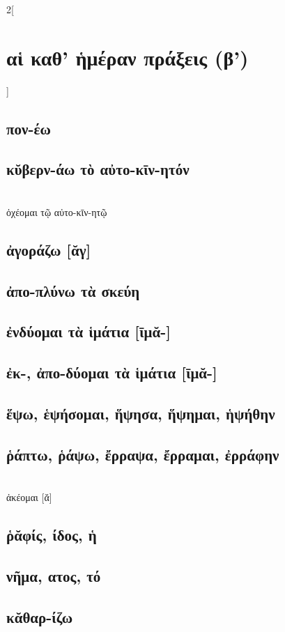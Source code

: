 \documentclass{book}
\begin{document}
\newpage
\begin{multicols}{2}[\section{αἱ καθ' ἡμέραν πράξεις (β')}]
\subsection{πον-έω}
\subsection{κῠβερν-άω τὸ αὐτο-κῑν-ητόν}  ~\\
ὀχέομαι τῷ αὐτο-κῑν-ητῷ 
\subsection{ἀγοράζω [ᾰγ]}
\subsection{ἀπο-πλύνω τὰ σκεύη}
\subsection{ἐνδύομαι τὰ ἱμάτια [ῑμᾰ-]}
\subsection{ἐκ-, ἀπο-δύομαι τὰ ἱμάτια [ῑμᾰ-]}
 
\subsection{ἕψω, ἑψήσομαι, ἥψησα, ἥψημαι, ἡψήθην}
\subsection{ῥάπτω, ῥάψω, ἔρραψα, ἔρραμαι, ἐρράφην} ~\\
ἀκέομαι [ᾰ] 
\subsection{ῥᾰφίς, ίδος, ἡ}
\subsection{νῆμα, ατος, τό} 
\subsection{κᾰθαρ-ίζω}

~
\end{multicols}
\end{document}

